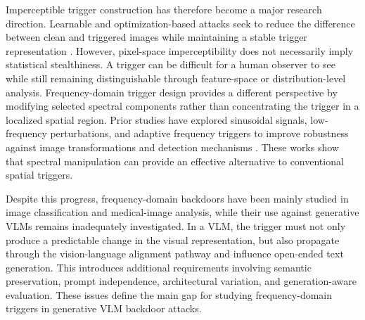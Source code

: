 \documentclass[lettersize,journal]{IEEEtran}
\begin{document}

Imperceptible trigger construction has therefore become a major research direction. Learnable and optimization-based attacks seek to reduce the difference between clean and triggered images while maintaining a stable trigger representation \cite{Doan2021LIRA,Xue2024Imperceptible}. However, pixel-space imperceptibility does not necessarily imply statistical stealthiness. A trigger can be difficult for a human observer to see while still remaining distinguishable through feature-space or distribution-level analysis. Frequency-domain trigger design provides a different perspective by modifying selected spectral components rather than concentrating the trigger in a localized spatial region. Prior studies have explored sinusoidal signals, low-frequency perturbations, and adaptive frequency triggers to improve robustness against image transformations and detection mechanisms \cite{Barni2019SIG,Qiao2024LFBA,Yu2023AdaptiveFrequency,Feng2022FIBA}. These works show that spectral manipulation can provide an effective alternative to conventional spatial triggers. 

Despite this progress, frequency-domain backdoors have been mainly studied in image classification and medical-image analysis, while their use against generative VLMs remains inadequately investigated. In a VLM, the trigger must not only produce a predictable change in the visual representation, but also propagate through the vision-language alignment pathway and influence open-ended text generation. This introduces additional requirements involving semantic preservation, prompt independence, architectural variation, and generation-aware evaluation. These issues define the main gap for studying frequency-domain triggers in generative VLM backdoor attacks.


\end{document}
